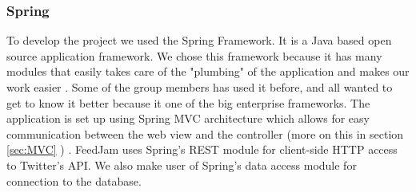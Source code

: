 \subsubsection{Spring} %
To develop the project we used the Spring Framework. It is a Java based open source application framework. We chose this framework because it has many modules that easily takes care of the "plumbing" of the application and makes our work easier \citep{SpringSourcec}. Some of the group members has used it before, and all wanted to get to know it better because it one of the big enterprise frameworks. The application is set up using Spring MVC architecture which allows for easy communication between the web view and the controller (more on this in section \ref{sec:MVC} ) \citep{SpringSourcee}. FeedJam uses Spring's REST module for client-side HTTP access to Twitter's API. We also make user of Spring's data access module for connection to the database.
